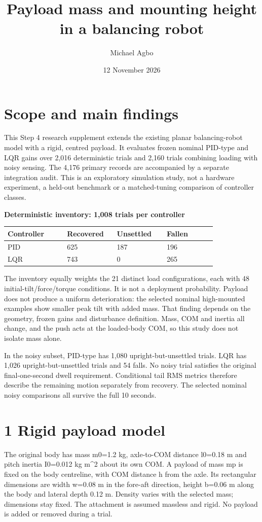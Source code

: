 \documentclass[11pt,a4paper]{article}
\title{Payload mass and mounting height in a balancing robot}
\author{Michael Agbo}
\date{12 November 2026}
\begin{document}
\maketitle
\section*{Scope and main findings}
This Step 4 research supplement extends the existing planar balancing-robot model with a rigid, centred payload. It evaluates frozen nominal PID-type and LQR gains over 2,016 deterministic trials and 2,160 trials combining loading with noisy sensing. The 4,176 primary records are accompanied by a separate integration audit. This is an exploratory simulation study, not a hardware experiment, a held-out benchmark or a matched-tuning comparison of controller classes.

\textbf{Deterministic inventory: 1,008 trials per controller}
\begin{longtable}{p{0.252\linewidth}p{0.216\linewidth}p{0.216\linewidth}p{0.216\linewidth}}
\toprule
Controller & Recovered & Unsettled & Fallen \\ \midrule \endhead
PID & 625 & 187 & 196 \\
LQR & 743 & 0 & 265 \\
\bottomrule
\end{longtable}
The inventory equally weights the 21 distinct load configurations, each with 48 initial-tilt/force/torque conditions. It is not a deployment probability. Payload does not produce a uniform deterioration: the selected nominal high-mounted examples show smaller peak tilt with added mass. That finding depends on the geometry, frozen gains and disturbance definition. Mass, COM and inertia all change, and the push acts at the loaded-body COM, so this study does not isolate mass alone.

In the noisy subset, PID-type has 1,080 upright-but-unsettled trials. LQR has 1,026 upright-but-unsettled trials and 54 falls. No noisy trial satisfies the original final-one-second dwell requirement. Conditional tail RMS metrics therefore describe the remaining motion separately from recovery. The selected nominal noisy comparisons all survive the full 10 seconds.

\section*{1 Rigid payload model}
The original body has mass m0=1.2 kg, axle-to-COM distance l0=0.18 m and pitch inertia I0=0.012 kg m\textasciicircum{}2 about its own COM. A payload of mass mp is fixed on the body centreline, with COM distance h from the axle. Its rectangular dimensions are width w=0.08 m in the fore-aft direction, height b=0.06 m along the body and lateral depth 0.12 m. Density varies with the selected mass; dimensions stay fixed. The attachment is assumed massless and rigid. No payload is added or removed during a trial.
\end{document}
